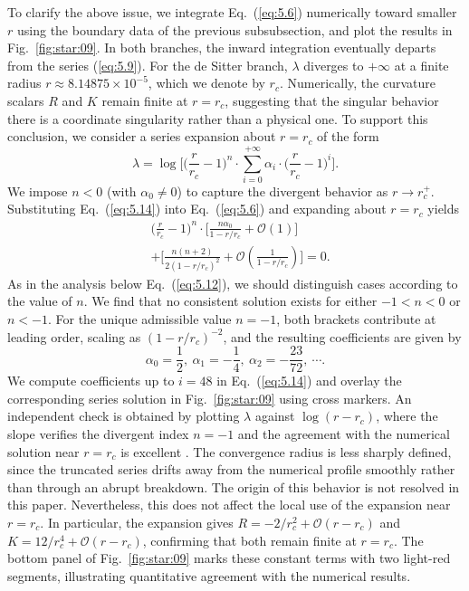 \documentclass[aps,prd,twocolumn]{revtex4-2}
\begin{document}
To clarify the above issue, we integrate Eq.~(\ref{eq:5.6}) numerically toward smaller $r$ using the boundary data of the previous subsubsection, and plot the results in Fig.~\ref{fig:star:09}. In both branches, the inward integration eventually departs from the series (\ref{eq:5.9}). For the de Sitter branch, $\lambda$ diverges to $+\infty$ at a finite radius $r\approx8.14875\times10^{-5}$, which we denote by $r_c$. Numerically, the curvature scalars $R$ and $K$ remain finite at $r=r_c$, suggesting that the singular behavior there is a coordinate singularity rather than a physical one. To support this conclusion, we consider a series expansion about $r=r_c$ of the form
\begin{equation}\label{eq:5.14}
  \lambda = \log \bigg[ \Big(\frac{r}{r_c}-1\Big)^{n} \cdot \sum_{i=0}^{+\infty} \alpha_i\cdot\Big(\frac{r}{r_c}-1\Big)^{i} \bigg].
\end{equation}
We impose $n<0$ (with $\alpha_0\neq0$) to capture the divergent behavior as $r\rightarrow r_c^{+}$. Substituting Eq.~(\ref{eq:5.14}) into Eq.~(\ref{eq:5.6}) and expanding about $r=r_c$ yields
\begin{align}
  & \Big(\frac{r}{r_c}-1\Big)^n \cdot \Big[ \frac{n\alpha_0}{1-r/r_c} + \mathcal{O}(1) \Big] \nonumber\\
  & + \bigg[ \frac{n(n+2)}{2(1-r/r_c)^2} + \mathcal{O}(\frac{1}{1-r/r_c}) \bigg] = 0. 
\end{align}
As in the analysis below Eq.~(\ref{eq:5.12}), we should distinguish cases according to the value of $n$. We find that no consistent solution exists for either $-1<n<0$ or $n<-1$. For the unique admissible value $n=-1$, both brackets contribute at leading order, scaling as $(1-r/r_c)^{-2}$, and the resulting coefficients are given by
\begin{equation}\label{eq:5.16}
  \alpha_0=\frac{1}{2}, \
  \alpha_1=-\frac{1}{4}, \
  \alpha_2=-\frac{23}{72}, \
  \cdots.
\end{equation}
We compute coefficients up to $i=48$ in Eq.~(\ref{eq:5.14}) and overlay the corresponding series solution in Fig.~\ref{fig:star:09} using cross markers. An independent check is obtained by plotting $\lambda$ against $\log(r-r_c)$, where the slope verifies the divergent index $n=-1$ and the agreement with the numerical solution near $r=r_c$ is excellent \cite{NotShown}. The convergence radius is less sharply defined, since the truncated series drifts away from the numerical profile smoothly rather than through an abrupt breakdown. The origin of this behavior is not resolved in this paper. Nevertheless, this does not affect the local use of the expansion near $r=r_c$. In particular, the expansion gives $R=-2/r_c^2+\mathcal{O}(r-r_c)$ and $K=12/r_c^4+\mathcal{O}(r-r_c)$, confirming that both remain finite at $r=r_c$. The bottom panel of Fig.~\ref{fig:star:09} marks these constant terms with two light-red segments, illustrating quantitative agreement with the numerical results.
\end{document}
